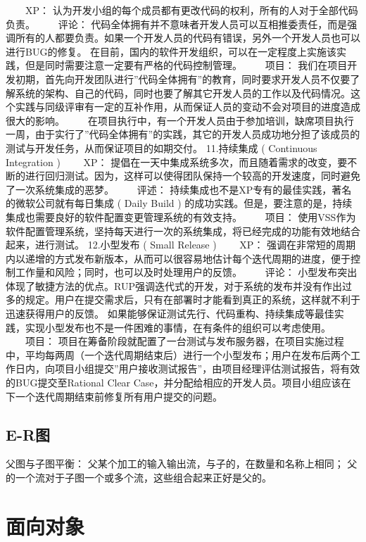 \documentclass[UTF8]{article}
\begin{document}
　　XP： 认为开发小组的每个成员都有更改代码的权利，所有的人对于全部代码负责。
　　评论： 代码全体拥有并不意味者开发人员可以互相推委责任，而是强调所有的人都要负责。如果一个开发人员的代码有错误，另外一个开发人员也可以进行BUG的修复。
在目前，国内的软件开发组织，可以在一定程度上实施该实践，但是同时需要注意一定要有严格的代码控制管理。
　　项目： 我们在项目开发初期，首先向开发团队进行”代码全体拥有”的教育，同时要求开发人员不仅要了解系统的架构、自己的代码，同时也要了解其它开发人员的工作以及代码情况。这个实践与同级评审有一定的互补作用，从而保证人员的变动不会对项目的进度造成很大的影响。
　　在项目执行中，有一个开发人员由于参加培训，缺席项目执行一周，由于实行了”代码全体拥有”的实践，其它的开发人员成功地分担了该成员的测试与开发任务，从而保证项目的如期交付。
11.持续集成 ( Continuous Integration )
　　XP： 提倡在一天中集成系统多次，而且随着需求的改变，要不断的进行回归测试。因为，这样可以使得团队保持一个较高的开发速度，同时避免了一次系统集成的恶梦。
　　评述： 持续集成也不是XP专有的最佳实践，著名的微软公司就有每日集成 ( Daily Build ) 的成功实践。但是，要注意的是，持续集成也需要良好的软件配置变更管理系统的有效支持。
　　项目： 使用VSS作为软件配置管理系统，坚持每天进行一次的系统集成，将已经完成的功能有效地结合起来，进行测试。
12.小型发布 ( Small Release )
　　XP： 强调在非常短的周期内以递增的方式发布新版本，从而可以很容易地估计每个迭代周期的进度，便于控制工作量和风险；同时，也可以及时处理用户的反馈。
　　评论： 小型发布突出体现了敏捷方法的优点。RUP强调迭代式的开发，对于系统的发布并没有作出过多的规定。用户在提交需求后，只有在部署时才能看到真正的系统，这样就不利于迅速获得用户的反馈。
如果能够保证测试先行、代码重构、持续集成等最佳实践，实现小型发布也不是一件困难的事情，在有条件的组织可以考虑使用。
　　项目： 项目在筹备阶段就配置了一台测试与发布服务器，在项目实施过程中，平均每两周（一个迭代周期结束后）进行一个小型发布；用户在发布后两个工作日内，向项目小组提交”用户接收测试报告”，由项目经理评估测试报告，将有效的BUG提交至Rational Clear Case，并分配给相应的开发人员。项目小组应该在下一个迭代周期结束前修复所有用户提交的问题。



\subsection{E-R图}
父图与子图平衡：
父某个加工的输入输出流，与子的，在数量和名称上相同；
父的一个流对于子图一个或多个流，这些组合起来正好是父的。



\section{面向对象}
\end{document}
